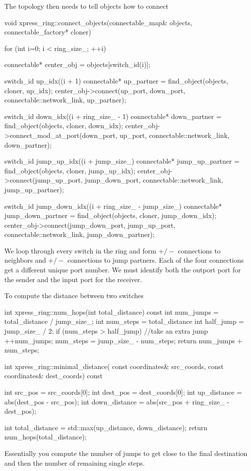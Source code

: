 The topology then needs to tell objects how to connect

\begin{CppCode}
void
xpress_ring::connect_objects(connectable_map& objects,
                             connectable_factory* cloner)
{
  for (int i=0; i < ring_size_; ++i) {
    connectable* center_obj = objects[switch_id(i)];

    switch_id up_idx((i + 1) %
    connectable* up_partner = find_object(objects, cloner, up_idx);
    center_obj->connect(up_port, down_port, connectable::network_link, up_partner);

    switch_id down_idx((i + ring_size_ - 1) %
    connectable* down_partner = find_object(objects, cloner, down_idx);
    center_obj->connect_mod_at_port(down_port, up_port, connectable::network_link,
                                    down_partner);

    switch_id jump_up_idx((i + jump_size_) %
    connectable* jump_up_partner = find_object(objects, cloner, jump_up_idx);
    center_obj->connect(jump_up_port, jump_down_port, connectable::network_link,
                                    jump_up_partner);

    switch_id jump_down_idx((i + ring_size_ - jump_size_) %
    connectable* jump_down_partner = find_object(objects, cloner,
                                         jump_down_idx);
    center_obj->connect(jump_down_port, jump_up_port, connectable::network_link,
                                    jump_down_partner);
  }
}
\end{CppCode}
We loop through every switch in the ring and form $+/-$ connections to neighbors and $+/-$ connections to jump partners.
Each of the four connections get a different unique port number.  We must identify both the outport port for the sender and the input port for the receiver.

To compute the distance between two switches

\begin{CppCode}
int
xpress_ring::num_hops(int total_distance) const
{
  int num_jumps = total_distance / jump_size_;
  int num_steps = total_distance %
  int half_jump = jump_size_ / 2;
  if (num_steps > half_jump) {
    //take an extra jump
    ++num_jumps;
    num_steps = jump_size_ - num_steps;
  }
  return num_jumps + num_steps;
}

int
xpress_ring::minimal_distance(
  const coordinates& src_coords,
  const coordinates& dest_coords) const
{
  int src_pos = src_coords[0];
  int dest_pos = dest_coords[0];
  int up_distance = abs(dest_pos - src_pos);
  int down_distance = abs(src_pos + ring_size_ - dest_pos);

  int total_distance = std::max(up_distance, down_distance);
  return num_hops(total_distance);
}
\end{CppCode}
Essentially you compute the number of jumps to get close to the final destination and then the number of remaining single steps.

